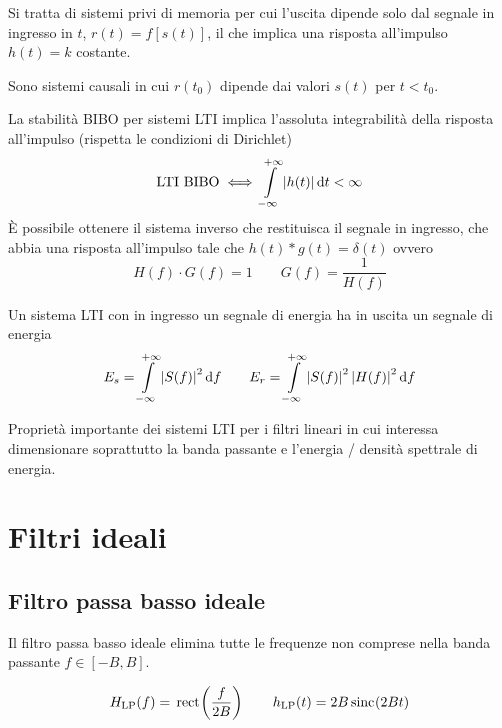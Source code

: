 Si tratta di sistemi privi di memoria per cui l'uscita dipende solo dal segnale in ingresso in $t$, $r(t)=f[s(t)]$, il che implica una risposta all'impulso $h(t)=k$ costante.

Sono sistemi causali in cui $r(t_0)$ dipende dai valori $s(t)$ per $t<t_0$.

La stabilità BIBO per sistemi LTI implica l'assoluta integrabilità della risposta all'impulso (rispetta le condizioni di Dirichlet)
\[ \text{LTI BIBO}\iff \int\limits_{-\infty}^{+\infty}{\left|{h(t)}\right|}{\,\mathop{}\!\mathrm{d}{t}}<\infty \]
\`{E} possibile ottenere il sistema inverso che restituisca il segnale in ingresso, che abbia una risposta all'impulso tale che $h(t)\ast g(t)=\delta(t)$ ovvero
\[H(f)\cdot G(f)=1 \qquad G(f)=\frac{1}{H(f)}\]

Un sistema LTI con in ingresso un segnale di energia ha in uscita un segnale di energia
\[ E_s=\int\limits_{-\infty}^{+\infty}{\left|{S(f)}\right|^2}{\,\mathop{}\!\mathrm{d}{f}} \qquad E_r=\int\limits_{-\infty}^{+\infty}{\left|{S(f)}\right|^2 \left|{H(f)}\right|^2}{\,\mathop{}\!\mathrm{d}{f}} \]
\begin{nota}Proprietà importante dei sistemi LTI per i filtri lineari in cui interessa dimensionare soprattutto la banda passante e l'energia / densità spettrale di energia.\end{nota}

\section{Filtri ideali}
\subsection{Filtro passa basso ideale}
Il filtro passa basso ideale elimina tutte le frequenze non comprese nella banda passante $f\in[-B,B]$.
\begin{figure}[h!]
\centering{}
\end{figure}
\begin{equation}
H_\text{LP}(f)=\,{\operatorname{rect}}^{}\!\left({\frac{f}{2B}}\right)\qquad h_\text{LP}(t)=2B\,{\operatorname{sinc}}^{}\!\left({2 B t}\right)
\end{equation}\label{eq:filtro_passa_basso_ideale}

